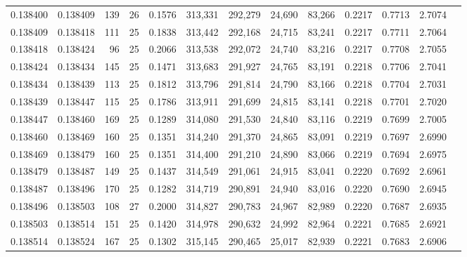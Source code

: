 \begin{tabular}{rrrrrrrrrrrrr}
0.138400 & 0.138409 &   139 &  26 &                                     0.1576 & 313,331 & 292,279 &  24,690 &  83,266 & 0.2217 & 0.7713 & 2.7074 \\
0.138409 & 0.138418 &   111 &  25 &                                     0.1838 & 313,442 & 292,168 &  24,715 &  83,241 & 0.2217 & 0.7711 & 2.7064 \\
0.138418 & 0.138424 &    96 &  25 &                                     0.2066 & 313,538 & 292,072 &  24,740 &  83,216 & 0.2217 & 0.7708 & 2.7055 \\
0.138424 & 0.138434 &   145 &  25 &                                     0.1471 & 313,683 & 291,927 &  24,765 &  83,191 & 0.2218 & 0.7706 & 2.7041 \\
0.138434 & 0.138439 &   113 &  25 &                                     0.1812 & 313,796 & 291,814 &  24,790 &  83,166 & 0.2218 & 0.7704 & 2.7031 \\
0.138439 & 0.138447 &   115 &  25 &                                     0.1786 & 313,911 & 291,699 &  24,815 &  83,141 & 0.2218 & 0.7701 & 2.7020 \\
0.138447 & 0.138460 &   169 &  25 &                                     0.1289 & 314,080 & 291,530 &  24,840 &  83,116 & 0.2219 & 0.7699 & 2.7005 \\
0.138460 & 0.138469 &   160 &  25 &                                     0.1351 & 314,240 & 291,370 &  24,865 &  83,091 & 0.2219 & 0.7697 & 2.6990 \\
0.138469 & 0.138479 &   160 &  25 &                                     0.1351 & 314,400 & 291,210 &  24,890 &  83,066 & 0.2219 & 0.7694 & 2.6975 \\
0.138479 & 0.138487 &   149 &  25 &                                     0.1437 & 314,549 & 291,061 &  24,915 &  83,041 & 0.2220 & 0.7692 & 2.6961 \\
0.138487 & 0.138496 &   170 &  25 &                                     0.1282 & 314,719 & 290,891 &  24,940 &  83,016 & 0.2220 & 0.7690 & 2.6945 \\
0.138496 & 0.138503 &   108 &  27 &                                     0.2000 & 314,827 & 290,783 &  24,967 &  82,989 & 0.2220 & 0.7687 & 2.6935 \\
0.138503 & 0.138514 &   151 &  25 &                                     0.1420 & 314,978 & 290,632 &  24,992 &  82,964 & 0.2221 & 0.7685 & 2.6921 \\
0.138514 & 0.138524 &   167 &  25 &                                     0.1302 & 315,145 & 290,465 &  25,017 &  82,939 & 0.2221 & 0.7683 & 2.6906 \\

\end{tabular}
